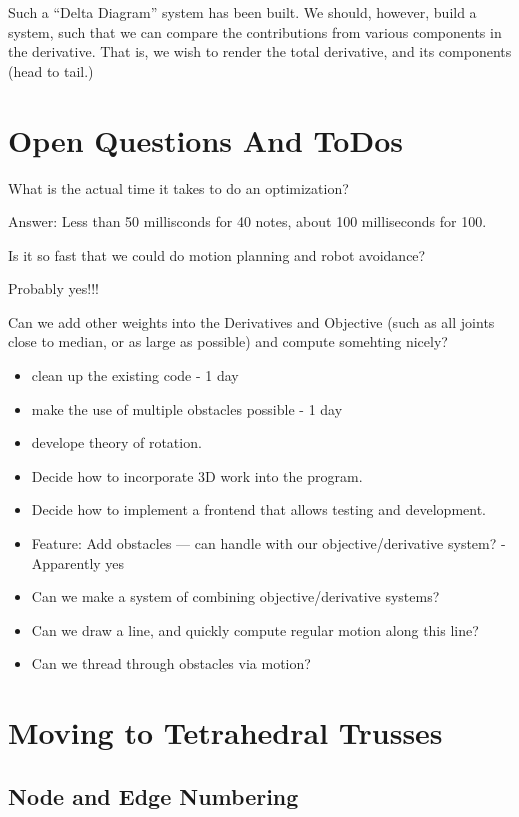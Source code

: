 \documentclass[11pt]{article}
\begin{document}
Such a ``Delta Diagram'' system has been built. We should, however, build a system, such that we can compare the contributions
from various components in the derivative. That is, we wish to render the total derivative, and its components (head to tail.)




\section{Open Questions And ToDos}

What is the actual time it takes to do an optimization?

Answer: Less than 50 millisconds for 40 notes, about 100 milliseconds for 100.

Is it so fast that we could do motion planning and robot avoidance?

Probably yes!!!

Can we add other weights into the Derivatives and Objective (such as all joints close to median, or as large as possible) and compute somehting nicely?

\begin{itemize}
\item clean up the existing code - 1 day
\item make the use of multiple obstacles possible - 1 day
\item develope theory of rotation.
  \item Decide how to incorporate 3D work into the program.
  \item Decide how to implement a frontend that allows testing and development.
    
\item Feature: Add obstacles --- can handle with our objective/derivative system? - Apparently yes
\item Can we make a system of combining objective/derivative systems?
\item Can we draw a line, and quickly compute regular motion along this line?
  \item Can we thread through obstacles via motion?
\end{itemize}

\section{Moving to Tetrahedral Trusses}

\subsection{Node and Edge Numbering}
\end{document}
